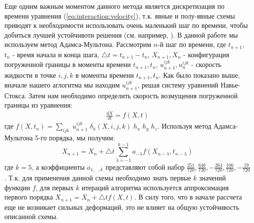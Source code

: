 Еще одним важным моментом данного метода является дискретизация по времени уравнения (\ref{eq:interaction:velocity}),
т.к. явные и полу-явные схемы приводят к необходимости
использовать очень маленький шаг по времени, чтобы добиться лучшей устойчивоти решения (см. например, \cite{griffith2012immersed}).
В данной работе мы используем метод Адамса-Мультона. Рассмотрим $n$-й шаг по времени, где $t_{n+1}$, $t_n$ - время начала и конца шага,
$\triangle t = t_{n+1} - t_n$, $X_{n+1}, X_n$ - конфигурация погруженной границы в моменты времени $t_{n+1}, t_n$,
$u_{n+1}^{ijk}, u_n^{ijk}$ - скорость жидкости в точке $i,j,k$ в моменты времени $t_{n+1}, t_n$.
Как было показано выше, вначале нашего аглогитма мы находим $u_{n+1}^{ijk}$, решая систему уравнений Навье-Стокса.
Затем нам необходимо определить скорость возмущения погруженной границы из уравнения:
\begin{gather}
    \frac{dX}{dt} = f(X, t)
\end{gather}
где $f(X, t_n) = \sum_{ijk}\; u_{n+1}^{ijk} \; \delta_h(X, i, j, k) \; h_x\; h_y\;  h_z$.
Используя метод Адамса-Мультона 5-го порядка, мы получим:
\begin{equation}
    X_{n+1} = X_n + \triangle t \sum_{\lambda=-1}^{k-1} a_{-\lambda} f(X_{n-\lambda}, t_{n-\lambda})
\end{equation}
где $k=5$, а коэффициенты $a_{1, _{\dots}, k}$ представляют собой набор $\frac{251}{720}, \frac{646}{720}, -\frac{264}{720}, \frac{106}{720}, -\frac{19}{720}$.
Т.к. для применения данной схемы необходимо знать первые $k$ значений функции $f$, для первых $k$ итераций алгоритма
используется аппроксимация первого порядка $X_{n+1} = X_n + \triangle t f(X, t)$. В силу того, что в начале рассчета
еще не возникает сильных деформаций, это не влияет на общую устойчивость описанной схемы.



